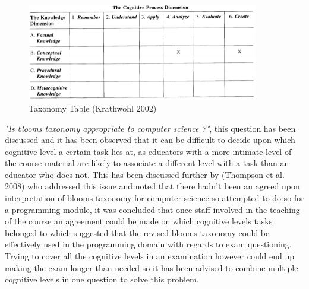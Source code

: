 \documentclass[12pt,a4paper]{article}
\begin{document}
\begin{figure}[h]
    \centering
    \includegraphics[width=0.9\textwidth]{Figs/blooms.PNG} 
    \caption{Taxonomy Table (Krathwohl 2002)}
\end{figure}  
\emph{"Is blooms taxonomy appropriate to computer science ?"}, this question has been discussed \cite{johnson2006bloom} and it has been observed that it can be difficult to decide upon which cognitive level a certain task lies at, as educators with a more intimate level of the course material are likely to associate a different level with a task than an educator who does not. This has been discussed further by (Thompson et al. 2008)\cite{thompson2008bloom} who addressed this issue and noted that there hadn't been an agreed upon interpretation of blooms taxonomy for computer science so attempted to do so for a programming module, it was concluded that once staff involved in the teaching of the course an agreement could be made on which cognitive levels tasks belonged to which suggested that the revised blooms taxonomy could be effectively used in the programming domain with regards to exam questioning. Trying to cover all the cognitive levels in an examination however could end up making the exam longer than needed so it has been advised \cite{scott2003bloom} to combine multiple cognitive levels in one question to solve this problem. 
\end{document}
